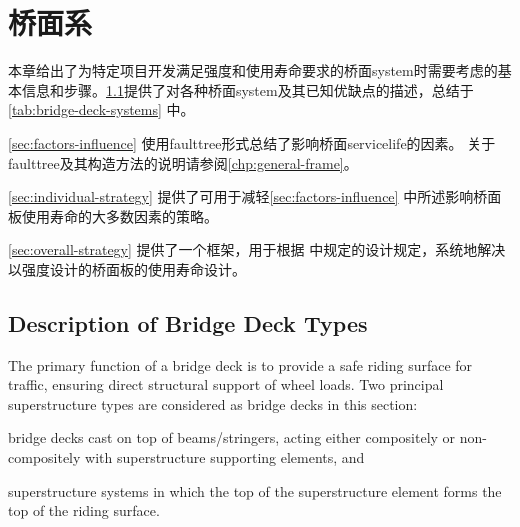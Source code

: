 \chapter{桥面系}
\label{chp:bridge-decks}
本章给出了为特定项目开发满足强度和使用寿命要求的桥面\gls*{system}时需要考虑的基本信息和步骤。\cref{sec:bridge-deck-types}提供了对各种桥面\gls*{system}及其已知优缺点的描述，总结于\cref{tab:bridge-deck-systems} 中。

\cref{sec:factors-influence} 使用\gls*{faulttree}形式总结了影响桥面\gls*{servicelife}的因素。 关于\gls*{faulttree}及其构造方法的说明请参阅\cref{chp:general-frame}。

\cref{sec:individual-strategy} 提供了可用于减轻\cref{sec:factors-influence} 中所述影响桥面板使用寿命的大多数因素的策略。

\cref{sec:overall-strategy} 提供了一个框架，用于根据 \lrfd \cite{aashto2012l}中规定的设计规定，系统地解决以强度设计的桥面板的使用寿命设计。

\section{Description of Bridge Deck Types}
\label{sec:bridge-deck-types}
The primary function of a bridge deck is to provide a safe riding surface for traffic, ensuring direct structural support of wheel loads. Two principal superstructure types are considered as bridge decks in this section: 
\begin{enumerate*}
  \item bridge decks cast on top of beams/stringers, acting either compositely or non-compositely with superstructure supporting elements, and 
  \item superstructure systems in which the top of the superstructure element forms the top of the riding surface.
\end{enumerate*}



